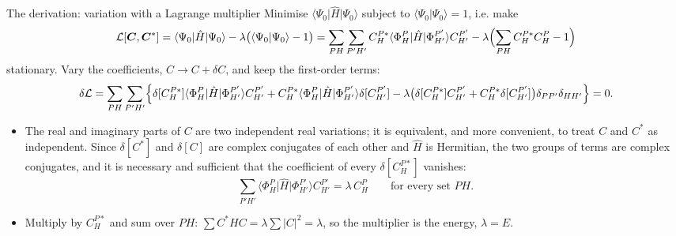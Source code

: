 \documentclass[aspectratio=169,10pt]{beamer}
\newcommand{\ket}[1]{\vert #1\rangle}
\newcommand{\bra}[1]{\langle #1\vert}
\newcommand{\braket}[2]{\langle #1\vert #2\rangle}
\begin{document}
\begin{frame}{The derivation: variation with a Lagrange multiplier}
  \footnotesize
  Minimise $\bra{\Psi_0}\hat{H}\ket{\Psi_0}$ subject to $\braket{\Psi_0}{\Psi_0}=1$, i.e. make
  \[
    \mathcal{L}[\bm{C},\bm{C}^{*}]=\bra{\Psi_0}\hat{H}\ket{\Psi_0}-\lambda\bigl(\braket{\Psi_0}{\Psi_0}-1\bigr)
    =\sum_{PH}\sum_{P'H'}C_H^{P*}\bra{\Phi_H^P}\hat{H}\ket{\Phi_{H'}^{P'}}C_{H'}^{P'}-\lambda\Bigl(\sum_{PH}C_H^{P*}C_H^{P}-1\Bigr)
  \]
  stationary. Vary the coefficients, $C\to C+\delta C$, and keep the first-order terms:
  \[
    \delta\mathcal{L}=\sum_{PH}\sum_{P'H'}\Bigl\{\delta[C_H^{P*}]\bra{\Phi_H^P}\hat{H}\ket{\Phi_{H'}^{P'}}C_{H'}^{P'}
    +C_H^{P*}\bra{\Phi_H^P}\hat{H}\ket{\Phi_{H'}^{P'}}\delta[C_{H'}^{P'}]
    -\lambda\bigl(\delta[C_H^{P*}]C_{H'}^{P'}+C_H^{P*}\delta[C_{H'}^{P'}]\bigr)\delta_{PP'}\delta_{HH'}\Bigr\}=0 .
  \]
  \begin{itemize}
    \item The real and imaginary parts of $C$ are two independent real variations; it is equivalent, and more convenient, to treat $C$ and $C^{*}$ as independent. Since $\delta[C^{*}]$ and $\delta[C]$ are complex conjugates of each other and $\hat{H}$ is Hermitian, the two groups of terms are complex conjugates, and it is necessary and sufficient that the coefficient of every $\delta[C_H^{P*}]$ vanishes:
    \[
      \sum_{P'H'}\bra{\Phi_H^P}\hat{H}\ket{\Phi_{H'}^{P'}}C_{H'}^{P'}=\lambda\,C_H^{P}\qquad\text{for every set }PH .
    \]
    \item Multiply by $C_H^{P*}$ and sum over $PH$: $\sum C^{*}HC=\lambda\sum|C|^2=\lambda$, so \alert{the multiplier is the energy}, $\lambda=E$.
  \end{itemize}
\end{frame}
\end{document}
